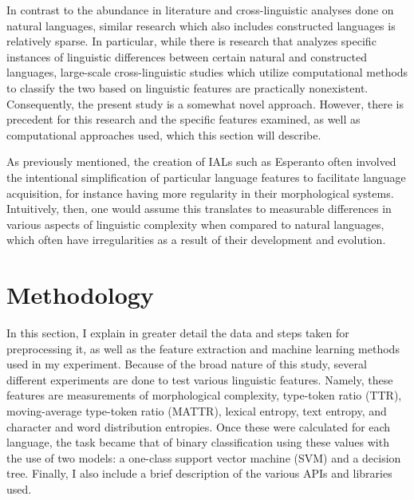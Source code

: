 \documentclass[12pt,a4paper]{article}
\numberwithin{figure}{section}
\numberwithin{table}{section}
\numberwithin{definition}{section}
\begin{document}
In contrast to the abundance in literature and cross-linguistic analyses done on natural languages, similar research which also includes constructed languages is relatively sparse. In particular, while there is research that analyzes specific instances of linguistic differences between certain natural and constructed languages, large-scale cross-linguistic studies which utilize computational methods to classify the two based on linguistic features are practically nonexistent. Consequently, the present study is a somewhat novel approach. However, there is precedent for this research and the specific features examined, as well as computational approaches used, which this section will describe.

As previously mentioned, the creation of IALs such as Esperanto often involved the intentional simplification of particular language features to facilitate language acquisition, for instance having more regularity in their morphological systems. Intuitively, then, one would assume this translates to measurable differences in various aspects of linguistic complexity when compared to natural languages, which often have irregularities as a result of their development and evolution. 


\newpage
\section{Methodology}
\label{sec:methodology}

In this section, I explain in greater detail the data and steps taken for preprocessing it, as well as the feature extraction and machine learning methods used in my experiment. Because of the broad nature of this study, several different experiments are done to test various linguistic features. Namely, these features are measurements of morphological complexity, type-token ratio (TTR), moving-average type-token ratio (MATTR), lexical entropy, text entropy, and character and word distribution entropies. Once these were calculated for each language, the task became that of binary classification using these values with the use of two models: a one-class support vector machine (SVM) and a decision tree. Finally, I also include a brief description of the various APIs and libraries used.
\end{document}
